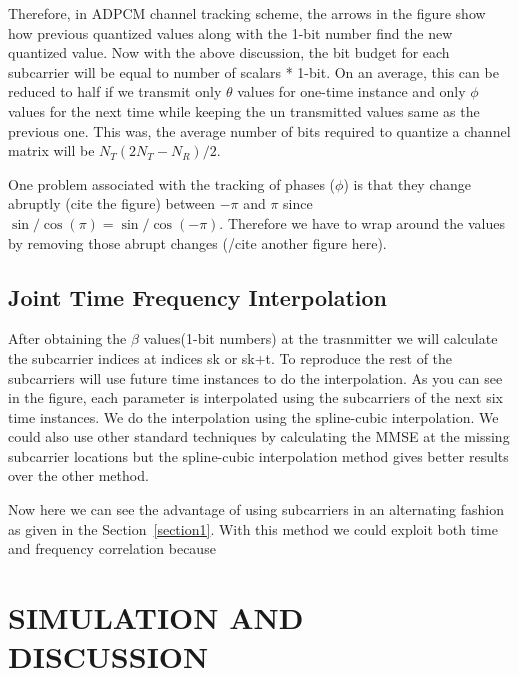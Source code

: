 \documentclass[conference]{IEEEtran}
\begin{document}
Therefore, in ADPCM channel tracking scheme, the arrows in the figure show how previous quantized values along with the 1-bit number find the new quantized value. Now with the above discussion, the bit budget for each subcarrier will be equal to number of scalars * 1-bit. On an average, this can be reduced to half if we transmit only $\theta$ values for one-time instance and only $\phi$ values for the next time while keeping the un transmitted values same as the previous one. This was, the average number of bits required to quantize a channel matrix will be $N_{T}(2N_{T} - N_{R})/2$. 

One problem associated with the tracking of phases ($\phi$) is that they change abruptly (cite the figure) between $-\pi$ and $\pi$ since $\sin/\cos(\pi) =\sin/\cos(-\pi)$. Therefore we have to wrap around the values by removing those abrupt changes (/cite another figure here). 


\subsection{Joint Time Frequency Interpolation} 
\label{interp} 

After obtaining the $\beta$ values(1-bit numbers) at the trasnmitter we will calculate the subcarrier indices at indices sk or sk+t. To reproduce the rest of the subcarriers will use future time instances to do the interpolation. As you can see in the figure, each parameter is interpolated using the subcarriers of the next six time instances. We do the interpolation using the spline-cubic interpolation. We could also use other standard techniques by calculating the MMSE at the missing subcarrier locations but the spline-cubic interpolation method gives better results over the other method. 

Now here we can see the advantage of using subcarriers in an alternating fashion as given in the Section~\ref{section1}. With this method we could exploit both time and frequency correlation because 


\section{SIMULATION AND DISCUSSION} 
\label{section3}
\end{document}
